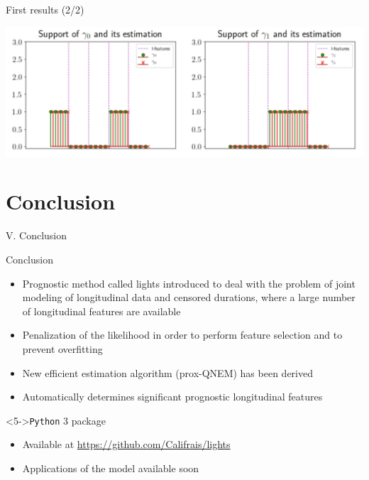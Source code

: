 \documentclass{beamer}
\begin{document}
\begin{frame}{First results (2/2)}

\centering
\includegraphics[width=1\textwidth]{./figures/gamma_estimation}

\end{frame}


\section{Conclusion}

\begin{frame}[noframenumbering]
\Large \centering
\textcolor{blue_pres}{V.} Conclusion
\end{frame}

\begin{frame}{Conclusion}

\begin{itemize}
  \item<1-> Prognostic method called lights introduced to deal with the problem of joint modeling of longitudinal data and censored durations, where a large number of longitudinal features are available
  \item<2-> Penalization of the likelihood in order to perform feature selection and to prevent overfitting
  \item<3-> New efficient estimation algorithm (prox-QNEM) has been derived
  \item<4-> Automatically determines significant prognostic longitudinal features
\end{itemize}

\begin{block}<5->{\texttt{Python} 3 package}
\begin{itemize}
  \item<5-> Available at \small{\url{https://github.com/Califrais/lights}}
  \item<6-> Applications of the model available soon
\end{itemize}
\end{block}

\end{frame}
\end{document}
